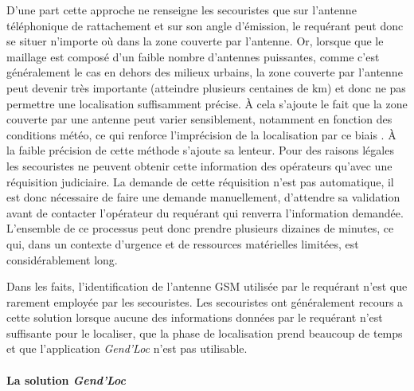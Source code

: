 D'une part cette approche ne renseigne les secouristes que sur
l'antenne téléphonique de rattachement et sur son angle d'émission, le
requérant peut donc se situer n'importe où dans la zone couverte par
l'antenne. Or, lorsque que le maillage est composé d'un faible nombre
d'antennes puissantes, comme c'est généralement le cas en dehors des
milieux urbains, la zone couverte par l'antenne peut devenir très
importante (\ie atteindre plusieurs centaines de km) et donc ne
pas permettre une localisation suffisamment précise. À cela s'ajoute
le fait que la zone couverte par une antenne peut varier sensiblement,
notamment en fonction des conditions météo, ce qui renforce
l'imprécision de la localisation par ce biais
\autocite{FenChong2012,OlteanuRaimond2012}. À la faible précision de
cette méthode s'ajoute sa lenteur. Pour des raisons légales les
secouristes ne peuvent obtenir cette information des opérateurs
qu'avec une réquisition judiciaire. La demande de cette réquisition
n'est pas automatique, il est donc nécessaire de faire une demande
manuellement, d'attendre sa validation avant de contacter l'opérateur
du requérant qui renverra l'information demandée. L'ensemble de ce
processus peut donc prendre plusieurs dizaines de minutes, ce qui,
dans un contexte d'urgence et de ressources matérielles limitées, est
considérablement long.

Dans les faits, l'identification de l'antenne GSM utilisée par le
requérant n'est que rarement employée par les secouristes. Les
secouristes ont généralement recours a cette solution lorsque aucune
des informations données par le requérant n'est suffisante pour le
localiser, que la phase de localisation prend beaucoup de temps et que
l’application \emph{Gend'Loc} n'est pas utilisable.

\paragraph{La solution \emph{Gend'Loc}}

